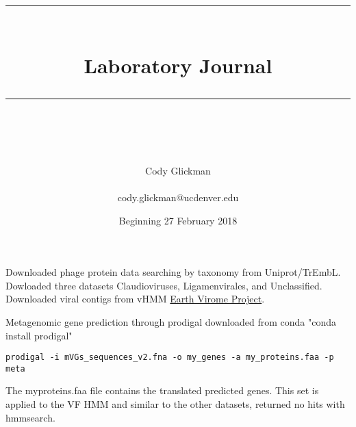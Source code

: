 \documentclass[idxtotoc,hyperref,openany,oneside]{labbook} %
\newcommand{\HRule}{\rule{\linewidth}{0.5mm}} %
\begin{document}

\frontmatter %
\title{
\begin{center}
\HRule \\[0.4cm]
{\Huge \bfseries Laboratory Journal \\[0.5cm] \Large} %
\HRule \\[1.5cm]
\end{center}
}
\author{\Huge Cody Glickman \\ \\ \LARGE cody.glickman@ucdenver.edu \\[2cm]} %
\date{Beginning 27 February 2018} %
\maketitle

\tableofcontents

\mainmatter %





Downloaded phage protein data searching by taxonomy from Uniprot/TrEmbL. Dowloaded three datasets Claudioviruses, Ligamenvirales, and Unclassified. Downloaded viral contigs from vHMM \href{http://portal.nersc.gov/dna/microbial/prokpubs/EarthVirome_DP/}{Earth Virome Project}. 

Metagenomic gene prediction through prodigal downloaded from conda "conda install prodigal"

\begin{verbatim}
prodigal -i mVGs_sequences_v2.fna -o my_genes -a my_proteins.faa -p meta
\end{verbatim}

The myproteins.faa file contains the translated predicted genes. This set is applied to the VF HMM and similar to the other datasets, returned no hits with hmmsearch. 

\vspace{0.3cm}
\end{document}
